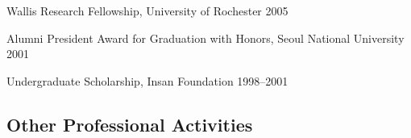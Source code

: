 \documentclass[12pt]{article}
\begin{document}
\begin{description}
\item \hspace{0.2in}Wallis Research Fellowship, University of Rochester \hfill  2005

\item \hspace{0.2in}Alumni President Award for Graduation with Honors, Seoul
National University \hfill 2001

\item \hspace{0.2in}Undergraduate Scholarship, Insan Foundation \hfill  1998--2001
\end{description}

\subsection*{Other Professional Activities}
\end{document}
